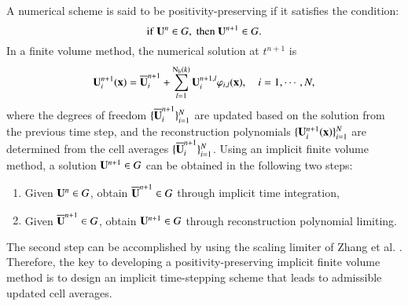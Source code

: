 A numerical scheme is said to be positivity-preserving if it satisfies the condition:
\begin{equation}
     \mathrm{if} \ \mathbf{U}^{n} \in G, \ \mathrm{then} \ \mathbf{U}^{n+1} \in G.
\end{equation}
In a finite volume method, the numerical solution at $t^{n+1}$ is
\begin{equation}
    \mathbf{U}^{n+1}_i (\mathbf{x})= \overline{\mathbf{U}}^{n+1}_i + \sum_{l=1}^{\mathrm{N_b}(k)} \mathbf{U}_i^{n+1,l} \varphi_{i,l}(\mathbf{x}), \quad i=1, \cdots,N,
\end{equation}
where the degrees of freedom $\{\overline{\mathbf{U}}^{n+1}_i\}_{i=1}^{N}$ are updated based on the solution from the previous time step, and the reconstruction polynomials $\{\mathbf{U}^{n+1}_i (\mathbf{x})\}_{i=1}^N$ are determined from the cell averages $\{\overline{\mathbf{U}}^{n+1}_i\}_{i=1}^N$.
Using an implicit finite volume method, a solution $\mathbf{U}^{n+1} \in G$ can be obtained in the following two steps:
\begin{enumerate}[label=(\arabic*)]
    \item Given $\mathbf{U}^n \in G$, obtain $\overline{\mathbf{U}}^{n+1} \in G$ through implicit time integration,
    \item Given $\overline{\mathbf{U}}^{n+1} \in G$, obtain $\mathbf{U}^{n+1} \in G$ through reconstruction polynomial limiting.
\end{enumerate}
The second step can be accomplished by using the scaling limiter of Zhang et al. \cite{zhang2010positivity}. Therefore, the key to developing a positivity-preserving implicit finite volume method is to design an implicit time-stepping scheme that leads to admissible updated cell averages.

